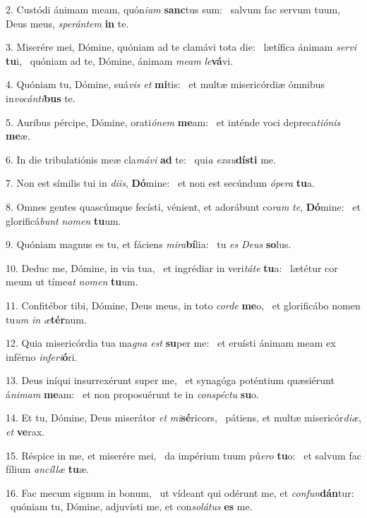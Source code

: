 2. Custódi ánimam meam, quón\textit{i}\textit{am} \textbf{sanc}tus sum: \ast\  salvum fac servum tuum, Deus meus, \textit{spe}\textit{rán}\textit{tem} \textbf{in} te.\

3. Miserére mei, Dómine, quóniam ad te clamávi tota die: \dag\  lætífica ánimam \textit{ser}\textit{vi} \textbf{tu}i, \ast\  quóniam ad te, Dómine, ánimam \textit{me}\textit{am} \textit{le}\textbf{vá}vi.\

4. Quóniam tu, Dómine, suá\textit{vis} \textit{et} \textbf{mi}tis: \ast\  et multæ misericórdiæ ómnibus in\textit{vo}\textit{cán}\textit{ti}\textbf{bus} te.\

5. Auribus pércipe, Dómine, orati\textit{ó}\textit{nem} \textbf{me}am: \ast\  et inténde voci depreca\textit{ti}\textit{ó}\textit{nis} \textbf{me}æ.\

6. In die tribulatiónis meæ cla\textit{má}\textit{vi} \textbf{ad} te: \ast\  qui\textit{a} \textit{ex}\textit{au}\textbf{dís}\textbf{ti} me.\

7. Non est símilis tui in \textit{di}\textit{is}, \textbf{Dó}mine: \ast\  et non est secúndum \textit{ó}\textit{pe}\textit{ra} \textbf{tu}a.\

8. Omnes gentes quascúmque fecísti, vénient, et adorábunt co\textit{ram} \textit{te}, \textbf{Dó}mine: \ast\  et glorificá\textit{bunt} \textit{no}\textit{men} \textbf{tu}um.\

9. Quóniam magnus es tu, et fáciens \textit{mi}\textit{ra}\textbf{bí}lia: \ast\  tu \textit{es} \textit{De}\textit{us} \textbf{so}lus.\

10. Deduc me, Dómine, in via tua, \dag\  et ingrédiar in veri\textit{tá}\textit{te} \textbf{tu}a: \ast\  lætétur cor meum ut tíme\textit{at} \textit{no}\textit{men} \textbf{tu}um.\

11. Confitébor tibi, Dómine, Deus meus, in toto \textit{cor}\textit{de} \textbf{me}o, \ast\  et glorificábo nomen tu\textit{um} \textit{in} \textit{æ}\textbf{tér}num.\

12. Quia misericórdia tua ma\textit{gna} \textit{est} \textbf{su}per me: \ast\  et eruísti ánimam meam ex inférno \textit{in}\textit{fe}\textit{ri}\textbf{ó}ri.\

13. Deus iníqui insurrexérunt super me, \dag\  et synagóga poténtium quæsiérunt á\textit{ni}\textit{mam} \textbf{me}am: \ast\  et non proposuérunt te in \textit{con}\textit{spéc}\textit{tu} \textbf{su}o.\

14. Et tu, Dómine, Deus miserátor \textit{et} \textit{mi}\textbf{sé}ricors, \ast\  pátiens, et multæ misericór\textit{di}\textit{æ}, \textit{et} \textbf{ve}rax.\

15. Réspice in me, et miserére mei, \dag\  da impérium tuum pú\textit{e}\textit{ro} \textbf{tu}o: \ast\  et salvum fac fílium \textit{an}\textit{cíl}\textit{læ} \textbf{tu}æ.\

16. Fac mecum signum in bonum, \dag\  ut vídeant qui odérunt me, et \textit{con}\textit{fun}\textbf{dán}tur: \ast\  quóniam tu, Dómine, adjuvísti me, et con\textit{so}\textit{lá}\textit{tus} \textbf{es} me.\

